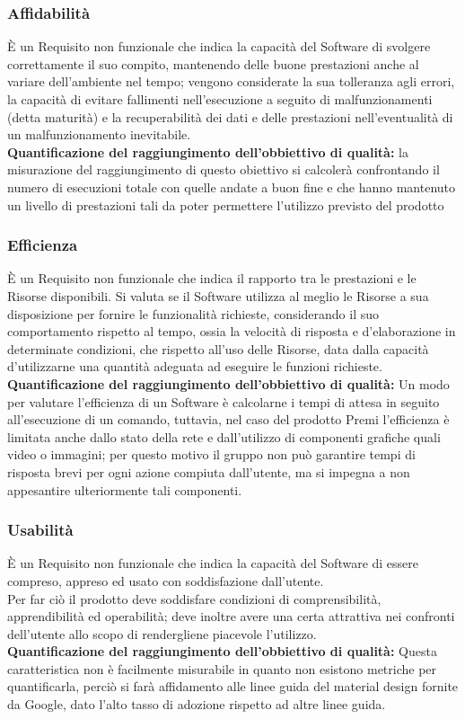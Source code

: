 \subsubsection{Affidabilità}
È un Requisito non funzionale che indica la capacità del Software di svolgere correttamente il suo compito, mantenendo delle buone prestazioni anche al variare dell'ambiente nel tempo; vengono considerate la sua tolleranza agli errori, la capacità di evitare fallimenti nell’esecuzione a seguito di malfunzionamenti (detta maturità) e la recuperabilità dei dati e delle prestazioni nell'eventualità di un malfunzionamento inevitabile.\\ \textbf{Quantificazione del raggiungimento dell’obbiettivo di qualità:} la misurazione del raggiungimento di questo obiettivo si calcolerà confrontando il numero di esecuzioni totale con quelle andate a buon fine e che hanno mantenuto un livello di prestazioni tali da poter permettere l’utilizzo previsto del prodotto

\subsubsection{Efficienza}
È un Requisito non funzionale che indica il rapporto tra le prestazioni e le Risorse disponibili.
Si valuta se il Software utilizza al meglio le Risorse a sua disposizione per fornire le funzionalità richieste, considerando il suo comportamento rispetto al tempo, ossia la velocità di risposta e d'elaborazione in determinate condizioni, che rispetto all’uso delle Risorse, data dalla capacità d'utilizzarne una quantità adeguata ad eseguire le funzioni richieste. \\
\textbf{Quantificazione del raggiungimento dell’obbiettivo di qualità:} Un modo per valutare l’efficienza di un Software è calcolarne i tempi di attesa in seguito all’esecuzione di un comando, tuttavia, nel caso del prodotto Premi l'efficienza è limitata anche dallo stato della rete e dall'utilizzo di componenti grafiche quali video o immagini; per questo motivo il gruppo non può garantire tempi di risposta brevi per ogni azione compiuta dall’utente, ma si impegna a non appesantire ulteriormente tali componenti.

\subsubsection{Usabilità}
È un Requisito non funzionale che indica la capacità del Software di essere compreso, appreso ed usato con soddisfazione dall'utente. \\
Per far ciò il prodotto deve soddisfare condizioni di comprensibilità, apprendibilità ed operabilità; deve inoltre avere una certa attrattiva nei confronti dell'utente allo scopo di rendergliene piacevole l’utilizzo.\\ \textbf{Quantificazione del raggiungimento dell’obbiettivo di qualità:} Questa caratteristica non è facilmente misurabile in quanto non esistono metriche per quantificarla, perciò si farà affidamento alle linee guida del material design fornite da Google, dato l'alto tasso di adozione rispetto ad altre linee guida.

